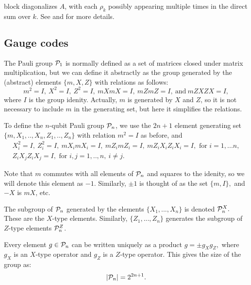 \documentclass[12pt,notitlepage,longbibliography,nofootinbib,tightenlines]{revtex4}
\begin{document}
block diagonalizes $A$,
with each $\rho_k$ possibly appearing multiple
times in the direct sum over $k$.
See \cite{Kaski2002} and \cite{Diaconis1981} for more details.

\subsection{Gauge codes}

The Pauli group $\mathcal{P}_1$ is normally 
defined as a set of matrices closed under
matrix multiplication, but we can define
it abstractly as the group generated
by the (abstract) elements $\{m, X, Z\}$ with
relations as follows:
$$
m^2=I,\ X^2=I,\ Z^2=I,\ mXmX=I,\ mZmZ=I,\ \mbox{and}\  mZXZX=I,
$$
where $I$ is the group idenity.
Actually, $m$ is generated by $X$ and $Z$, so
it is not necessary to include $m$ in the generating set,
but here it simplifies the relations.

To define the $n$-qubit Pauli group $\mathcal{P}_n$, 
we use the $2n+1$ element 
generating set $\{m, X_1, .., X_n, Z_1, .., Z_n\}$
with relation $m^2=I$ as before, and
$$
\begin{array}{c}
X_i^2=I,\ Z_i^2=I,\ mX_imX_i=I,\ mZ_imZ_i=I,\ mZ_iX_iZ_iX_i=I, 
\mbox{\ for\ } i=1,...n,\\
Z_iX_jZ_iX_j=I, \mbox{\ for\ } i, j = 1,..,n,\ i\ne j.
\end{array}
$$

Note that $m$ commutes with all elements of $\mathcal{P}_n$
and squares to the idenity, so we will denote this
element as $-1.$ Similarly, $\pm 1$ is thought of as the
set $\{m, I\},$ and $-X$ is $mX$, etc.

The subgroup of $\mathcal{P}_n$ generated by
the elements $\{X_1,...,X_n\}$ %
is denoted $\mathcal{P}_n^X.$ These are the $X$-type
elements. Similarly,
 $\{Z_1,...,Z_n\}$ generates %
the subgroup of $Z$-type elements $\mathcal{P}_n^Z$.

Every element $g\in\mathcal{P}_n$ can be written
uniquely as a product $g = \pm g_X g_Z,$
where $g_X$ is an $X$-type operator and $g_Z$
is a $Z$-type operator.
This gives the size of the group as:
$$
    |\mathcal{P}_n| = 2^{2n+1}.
$$
\end{document}
